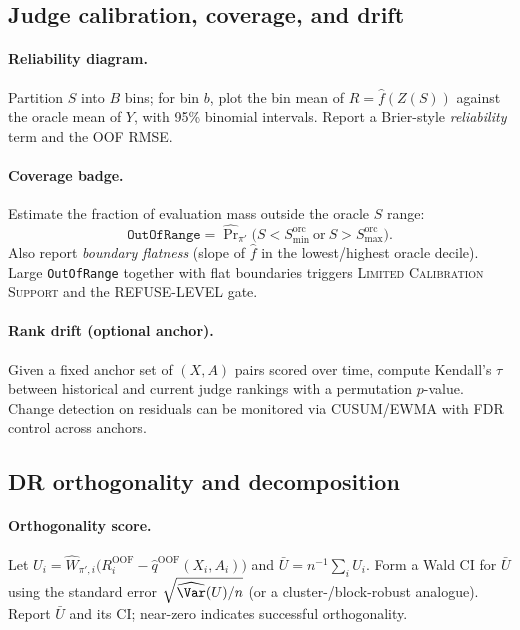 \subsection{Judge calibration, coverage, and drift}
\label{app:diag-judge}

\paragraph{Reliability diagram.}
Partition $S$ into $B$ bins; for bin $b$, plot the bin mean of $R=\hat f(Z(S))$ against the oracle mean of $Y$, with 95\% binomial intervals. Report a Brier-style \emph{reliability} term and the OOF RMSE.

\paragraph{Coverage badge.}
Estimate the fraction of evaluation mass outside the oracle $S$ range:
\[
\texttt{OutOfRange}=\widehat{\Pr}_{\pi'}\!\big(S<S_{\min}^{\text{orc}}\ \text{or}\ S>S_{\max}^{\text{orc}}\big).
\]
Also report \emph{boundary flatness} (slope of $\hat f$ in the lowest/highest oracle decile). Large \texttt{OutOfRange} together with flat boundaries triggers \textsc{Limited Calibration Support} and the \textsc{REFUSE-LEVEL} gate.

\paragraph{Rank drift (optional anchor).}
Given a fixed anchor set of $(X,A)$ pairs scored over time, compute Kendall’s $\tau$ between historical and current judge rankings with a permutation $p$-value. Change detection on residuals can be monitored via CUSUM/EWMA with FDR control across anchors.

\subsection{DR orthogonality and decomposition}
\label{app:diag-ortho}

\paragraph{Orthogonality score.}
Let $U_i=\hat W_{\pi',i}\big(R^{\mathrm{OOF}}_i-\hat q^{\mathrm{OOF}}(X_i,A_i)\big)$ and $\bar U=n^{-1}\sum_i U_i$.
Form a Wald CI for $\bar U$ using the standard error $\sqrt{\widehat{\Var}(U)/n}$ (or a cluster-/block-robust analogue). Report $\bar U$ and its CI; near-zero indicates successful orthogonality.

